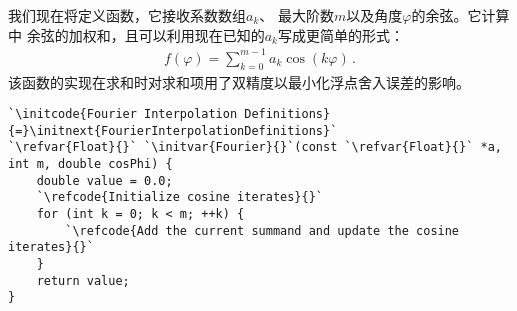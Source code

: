 我们现在将定义函数，它接收系数数组$a_k$、
最大阶数$m$以及角度$\varphi$的余弦。它计算中
余弦的加权和，且可以利用现在已知的$a_k$写成更简单的形式：
\begin{align}\label{eq:8.23}
    f(\varphi)=\sum\limits_{k=0}^{m-1}a_k\cos(k\varphi)\, .
\end{align}
该函数的实现在求和时对求和项用了双精度以最小化浮点舍入误差的影响。
\begin{lstlisting}
`\initcode{Fourier Interpolation Definitions}{=}\initnext{FourierInterpolationDefinitions}`
`\refvar{Float}{}` `\initvar{Fourier}{}`(const `\refvar{Float}{}` *a, int m, double cosPhi) {
    double value = 0.0;
    `\refcode{Initialize cosine iterates}{}`
    for (int k = 0; k < m; ++k) {
        `\refcode{Add the current summand and update the cosine iterates}{}`
    }
    return value;
}
\end{lstlisting}
